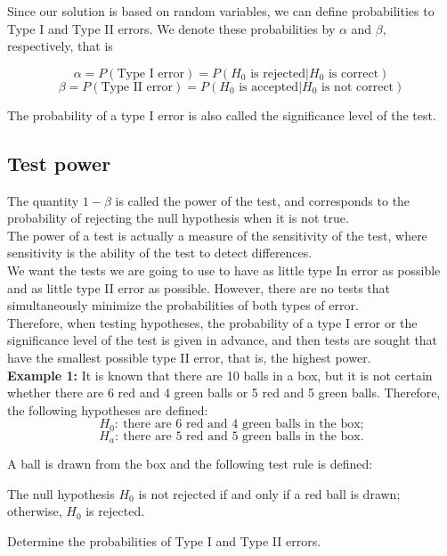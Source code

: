 \documentclass[a4paper, 12pt]{article}
\begin{document}
Since our solution is based on random variables, we can define probabilities to Type I and Type II errors. We denote these probabilities by $\alpha$ and $\beta$, respectively, that is

\[ \alpha = P(\text{Type I error}) = P(H_0 \text{ is rejected} | H_0 \text{ is correct} ) \]
\[ \beta = P(\text{Type II error}) = P(H_0 \text{ is accepted} | H_0 \text{ is not correct} ) \]

The probability of a type I error is also called the significance
level of the test.

\subsection{Test power}

The quantity $1 - \beta$ is called the power of the test, and corresponds to the probability of rejecting the null hypothesis when it is not true.\\


The power of a test is actually a measure of the sensitivity of the test, where sensitivity is the ability of the test to detect differences.\\

We want the tests we are going to use to have as little type In error as possible and as little type II error as possible. However, there are no tests that simultaneously minimize the probabilities of both types of error.\\

Therefore, when testing hypotheses, the probability of a type I error or the significance level of the test is given in advance, and then tests are sought that have the smallest possible type II error, that is, the highest power.\\

\textbf{Example 1: } It is known that there are 10 balls in a box, but it is not certain whether there are 6 red and 4 green balls or 5 red and 5 green balls. Therefore, the following hypotheses are defined:
\[
H_0:\ \text{there are 6 red and 4 green balls in the box;}
\]
\[
H_a:\ \text{there are 5 red and 5 green balls in the box.}
\]

A ball is drawn from the box and the following test rule is defined:

The null hypothesis $H_0$ is not rejected if and only if a red ball is drawn; otherwise, $H_0$ is rejected.

Determine the probabilities of Type I and Type II errors.
\end{document}
